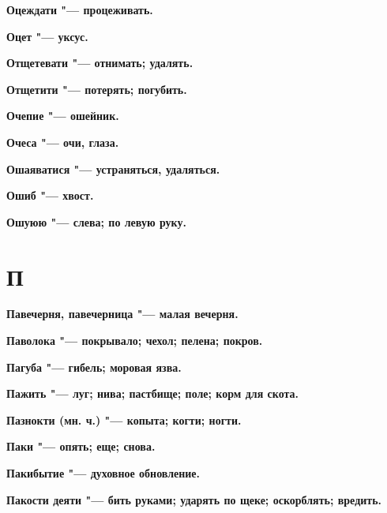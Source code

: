\begin{mymulticols}{2}
\bfseries Оцеждати\normalfont{} "--- процеживать. 




\bfseries Оцет\normalfont{} "--- уксус. 




\bfseries Отщетевати\normalfont{} "--- отнимать; удалять. 




\bfseries Отщетити\normalfont{} "--- потерять; погубить. 




\bfseries Очепие\normalfont{} "--- ошейник. 




\bfseries Очеса\normalfont{} "--- очи, глаза. 




\bfseries Ошаяватися\normalfont{} "--- устраняться, удаляться. 




\bfseries Ошиб\normalfont{} "--- хвост. 




\bfseries Ошуюю\normalfont{} "--- слева; по левую руку. 




\section{П}





\bfseries Павечерня, павечерница\normalfont{} "--- малая вечерня. 




\bfseries Паволока\normalfont{} "--- покрывало; чехол; пелена; покров. 




\bfseries Пагуба\normalfont{} "--- гибель; моровая язва. 




\bfseries Пажить\normalfont{} "--- луг; нива; пастбище; поле; корм для скота. 




\bfseries Пазнокти\normalfont{} (мн. ч.) "--- копыта; когти; ногти. 




\bfseries Паки\normalfont{} "--- опять; еще; снова. 




\bfseries Пакибытие\normalfont{} "--- духовное обновление. 




\bfseries Пакости деяти\normalfont{} "--- бить руками; ударять по щеке; оскорблять; вредить. 





\end{mymulticols}
